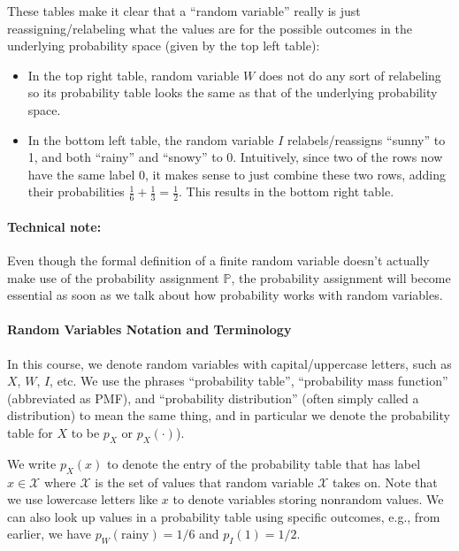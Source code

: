 \documentclass[6008notes.tex]{subfiles}
\begin{document}
These tables make it clear that a ``random variable'' really is just reassigning/relabeling what the values are for the possible outcomes in the underlying probability space (given by the top left table):

\begin{itemize}
\item In the top right table, random variable $W$ does not do any sort of relabeling so its probability table looks the same as that of the underlying probability space.

\item In the bottom left table, the random variable $I$ relabels/reassigns ``sunny'' to 1, and both ``rainy'' and ``snowy'' to 0. Intuitively, since two of the rows now have the same label 0, it makes sense to just combine these two rows, adding their probabilities $\frac{1}{6}+\frac{1}{3}=\frac{1}{2}$. This results in the bottom right table.
\end{itemize}

\paragraph{Technical note:} Even though the formal definition of a finite random variable doesn't actually make use of the probability assignment $\mathbb {P}$, the probability assignment will become essential as soon as we talk about how probability works with random variables.

\paragraph{Random Variables Notation and Terminology}

In this course, we denote random variables with capital/uppercase letters, such as $X$, $W$, $I$, etc. We use the phrases ``probability table'', ``probability mass function'' (abbreviated as PMF), and ``probability distribution'' (often simply called a distribution) to mean the same thing, and in particular we denote the probability table for $X$ to be $p_ X$ or $p_ X(\cdot )$).

We write $p_ X(x)$ to denote the entry of the probability table that has label $x \in \mathcal{X}$ where $\mathcal{X}$ is the set of values that random variable $\mathcal{X}$ takes on. Note that we use lowercase letters like $x$ to denote variables storing nonrandom values. We can also look up values in a probability table using specific outcomes, e.g., from earlier, we have $p_ W(\text {rainy}) = 1/6$ and $p_ I(1)=1/2$.
\end{document}
